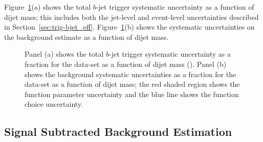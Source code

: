 \newpage
Figure~\ref{fig:lim-lowmass_syst}(a) shows the total $b$-jet trigger systematic uncertainty as a function of dijet  mass;
this includes both the jet-level and event-level uncertainties described in Section~\ref{sec:trig-bjet_eff}.
Figure~\ref{fig:lim-lowmass_syst}(b) shows the systematic uncertainties on the background estimate as a function of dijet  mass.

\begin{figure}[!ht]
  \begin{center}
    \captionsetup[subfigure]{aboveskip=0pt,justification=centering}
  \end{center}
  \vspace{-1em}
  \caption[The $b$-jet trigger and background systematic uncertainties for the \lm{} data-set as a function of dijet mass.]
    {Panel (a) shows the total $b$-jet trigger systematic uncertainty as a fraction for the \lm{} data-set as a function of dijet mass (\mjj).
    Panel (b) shows the background systematic uncertainties as a fraction for the \lm{} data-set as a function of dijet mass;
    the red shaded region shows the function parameter uncertainty and the blue line shows the function choice uncertainty.}
  \label{fig:lim-lowmass_syst}
\end{figure}

\FloatBarrier
\subsection{Signal Subtracted Background Estimation}
\label{sec:lim-full_ssb}

